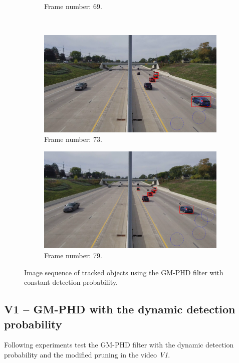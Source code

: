 \begin{figure}[H]
\begin{subfigure}{0.48\textwidth}
        \caption{Frame number: 69.}
        \label{fig:E1-V1-S0:06}
    \end{subfigure}
    \\
    \begin{subfigure}{0.48\textwidth}
        \centering
        \includegraphics[width=\linewidth]{../../../experiments/E1/V1/noPd/73}
        \caption{Frame number: 73.}
        \label{fig:E1-V1-S0:07}
    \end{subfigure}
    \begin{subfigure}{0.48\textwidth}
        \centering
        \includegraphics[width=\linewidth]{../../../experiments/E1/V1/noPd/79}
        \caption{Frame number: 79.}
        \label{fig:E1-V1-S0:08}
    \end{subfigure}
    \caption{Image sequence of tracked objects using the GM-PHD filter with constant detection probability.}
    \label{fig:E1-V1-S0}
\end{figure}

\subsection{V1 -- GM-PHD with the dynamic detection probability}
Following experiments test the GM-PHD filter with the dynamic detection probability and the modified pruning in the
video \textit{V1}.
